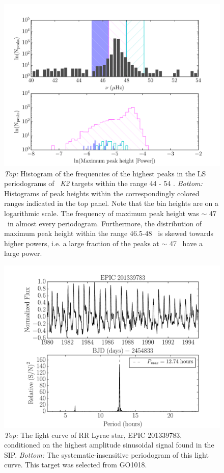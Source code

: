 \documentclass[useAMS, usenatbib, preprint, 12pt]{aastex}
\begin{document}
\begin{figure}
\begin{center}
\includegraphics[width=6in, clip=true]{vbg_hist.pdf}
\caption{{\it Top:} Histogram of the frequencies of the highest peaks in the
	LS periodograms of \nGO\ {\it K2} targets within the range 44 - 54
	\uHz.
	{\it Bottom:} Histograms of peak heights within the correspondingly
	colored ranges indicated in the top panel.
	Note that the bin heights are on a logarithmic scale.
	The frequency of maximum peak height was $\sim$ 47 \uHz\ in almost
	every periodogram.
	Furthermore, the distribution of maximum peak height within the range
	46.5-48 \uHz\ is skewed towards higher powers, i.e. a large fraction of
	the peaks at $\sim$ 47 \uHz\ have a large power.
}
\label{fig:vbg_hist}
\end{center}
\end{figure}

\begin{figure}
\begin{center}
\includegraphics[width=6in, clip=true]{RR_201339783.pdf}
\caption{{\it Top:} The light curve of RR Lyrae star, EPIC 201339783,
	conditioned on the highest amplitude sinusoidal signal found in the
	SIP. {\it Bottom:} The systematic-insensitive periodogram of
	this light curve. This target was selected from GO1018.}
\label{fig:RRLyrae}
\end{center}
\end{figure}
\end{document}
